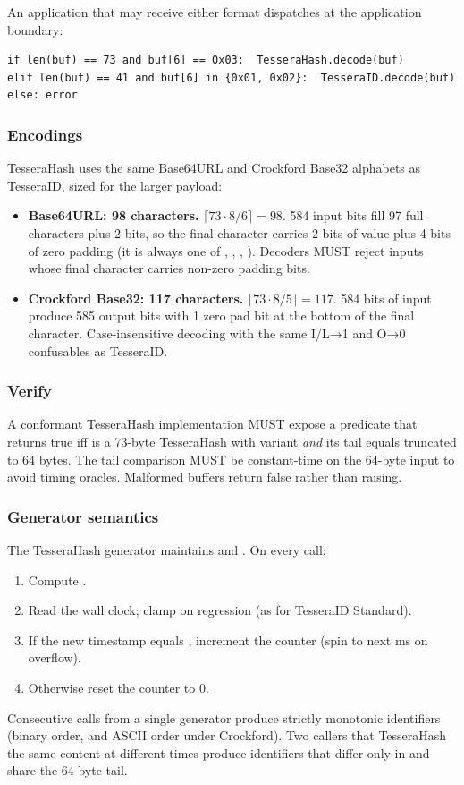 An application that may receive either format dispatches at the application boundary:

\begin{lstlisting}
if len(buf) == 73 and buf[6] == 0x03:  TesseraHash.decode(buf)
elif len(buf) == 41 and buf[6] in {0x01, 0x02}:  TesseraID.decode(buf)
else: error
\end{lstlisting}

\subsubsection{Encodings}

TesseraHash uses the same Base64URL and Crockford Base32 alphabets as TesseraID, sized for the larger payload:

\begin{itemize}
  \item \textbf{Base64URL: 98 characters.} $\lceil 73 \cdot 8 / 6 \rceil = 98$. 584 input bits fill 97 full characters plus 2 bits, so the final character carries 2 bits of value plus 4 bits of zero padding (it is always one of , , , ). Decoders MUST reject inputs whose final character carries non-zero padding bits.
  \item \textbf{Crockford Base32: 117 characters.} $\lceil 73 \cdot 8 / 5 \rceil = 117$. 584 bits of input produce 585 output bits with 1 zero pad bit at the bottom of the final character. Case-insensitive decoding with the same I/L→1 and O→0 confusables as TesseraID.
\end{itemize}

\subsubsection{Verify}

A conformant TesseraHash implementation MUST expose a  predicate that returns true iff  is a 73-byte TesseraHash with variant  \emph{and} its tail equals  truncated to 64 bytes. The tail comparison MUST be constant-time on the 64-byte input to avoid timing oracles. Malformed buffers return false rather than raising.

\subsubsection{Generator semantics}

The TesseraHash generator maintains  and . On every call:
\begin{enumerate}
  \item Compute .
  \item Read the wall clock; clamp on regression (as for TesseraID Standard).
  \item If the new timestamp equals , increment the counter (spin to next ms on overflow).
  \item Otherwise reset the counter to 0.
\end{enumerate}

Consecutive calls from a single generator produce strictly monotonic identifiers (binary order, and ASCII order under Crockford). Two callers that TesseraHash the same content at different times produce identifiers that differ only in  and share the 64-byte tail.

